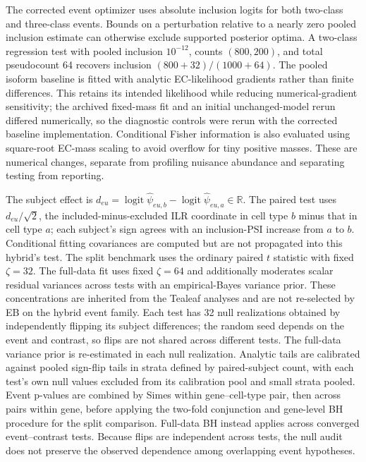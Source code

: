 \documentclass[11pt]{article}
\begin{document}
The corrected event optimizer uses absolute inclusion logits for both two-class and three-class events. Bounds on a perturbation relative to a nearly zero pooled inclusion estimate can otherwise exclude supported posterior optima. A two-class regression test with pooled inclusion \(10^{-12}\), counts \((800,200)\), and total pseudocount 64 recovers inclusion \((800+32)/(1000+64)\). The pooled isoform baseline is fitted with analytic EC-likelihood gradients rather than finite differences. This retains its intended likelihood while reducing numerical-gradient sensitivity; the archived fixed-mass fit and an initial unchanged-model rerun differed numerically, so the diagnostic controls were rerun with the corrected baseline implementation. Conditional Fisher information is also evaluated using square-root EC-mass scaling to avoid overflow for tiny positive masses. These are numerical changes, separate from profiling nuisance abundance and separating testing from reporting.

The subject effect is \(d_{eu}=\operatorname{logit}\widehat\psi_{eu,b}-\operatorname{logit}\widehat\psi_{eu,a}\in\mathbb R\). The paired test uses \(d_{eu}/\sqrt{2}\), the included-minus-excluded ILR coordinate in cell type \(b\) minus that in cell type \(a\); each subject's sign agrees with an inclusion-PSI increase from \(a\) to \(b\). Conditional fitting covariances are computed but are not propagated into this hybrid's test. The split benchmark uses the ordinary paired \(t\) statistic with fixed \(\zeta=32\). The full-data fit uses fixed \(\zeta=64\) and additionally moderates scalar residual variances across tests with an empirical-Bayes variance prior. These concentrations are inherited from the Tealeaf analyses and are not re-selected by EB on the hybrid event family. Each test has 32 null realizations obtained by independently flipping its subject differences; the random seed depends on the event and contrast, so flips are not shared across different tests. The full-data variance prior is re-estimated in each null realization. Analytic tails are calibrated against pooled sign-flip tails in strata defined by paired-subject count, with each test's own null values excluded from its calibration pool and small strata pooled. Event p-values are combined by Simes within gene--cell-type pair, then across pairs within gene, before applying the two-fold conjunction and gene-level BH procedure for the split comparison. Full-data BH instead applies across converged event--contrast tests. Because flips are independent across tests, the null audit does not preserve the observed dependence among overlapping event hypotheses.
\end{document}

